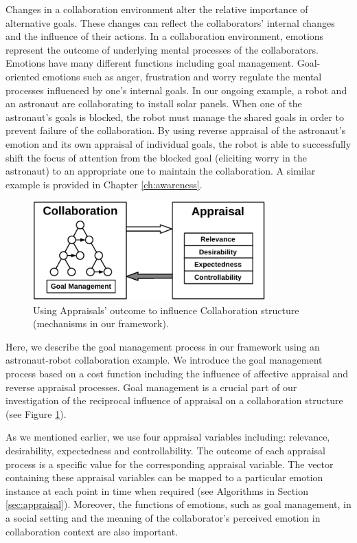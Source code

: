 \documentclass[12pt]{report}
\begin{document}
Changes in a collaboration environment alter the relative importance of
alternative goals. These changes can reflect the collaborators' internal changes
and the influence of their actions. In a collaboration environment, emotions
represent the outcome of underlying mental processes of the collaborators.
Emotions have many different functions
\cite{scheutz:architectural-action-selection} including goal management.
Goal-oriented emotions such as anger, frustration and worry regulate the mental
processes influenced by one's internal goals. In our ongoing example, a robot
and an astronaut are collaborating to install solar panels. When one of the
astronaut's goals is blocked, the robot must manage the shared goals in order to
prevent failure of the collaboration. By using reverse appraisal
\cite{gratch:reverse-appraisal} of the astronaut's emotion and its own appraisal
of individual goals, the robot is able to successfully shift the focus of
attention from the blocked goal (eliciting worry in the astronaut) to an
appropriate one to maintain the collaboration. A similar example is provided in
Chapter \ref{ch:awareness}.

\begin{figure}[t]
  \centering
  \includegraphics[width=0.8\textwidth]{figure/goal_management_croped.pdf}
  \caption{Using Appraisals' outcome to influence Collaboration structure
  (mechanisms in our framework).}
  \label{fig:appraisal-on-collaboration}
\end{figure}

Here, we describe the goal management process in our framework using an
astronaut-robot collaboration example. We introduce the goal management process
based on a cost function including the influence of affective appraisal and
reverse appraisal processes. Goal management is a crucial part of our
investigation of the reciprocal influence of appraisal on a collaboration
structure (see Figure \ref{fig:appraisal-on-collaboration}).

As we mentioned earlier, we use four appraisal variables including: relevance,
desirability, expectedness and controllability. The outcome of each appraisal
process is a specific value for the corresponding appraisal variable. The vector
containing these appraisal variables can be mapped to a particular emotion
instance at each point in time when required (see Algorithms in Section
\ref{sec:appraisal}). Moreover, the functions of emotions, such as goal
management, in a social setting and the meaning of the collaborator's perceived
emotion in collaboration context are also important.
\end{document}
